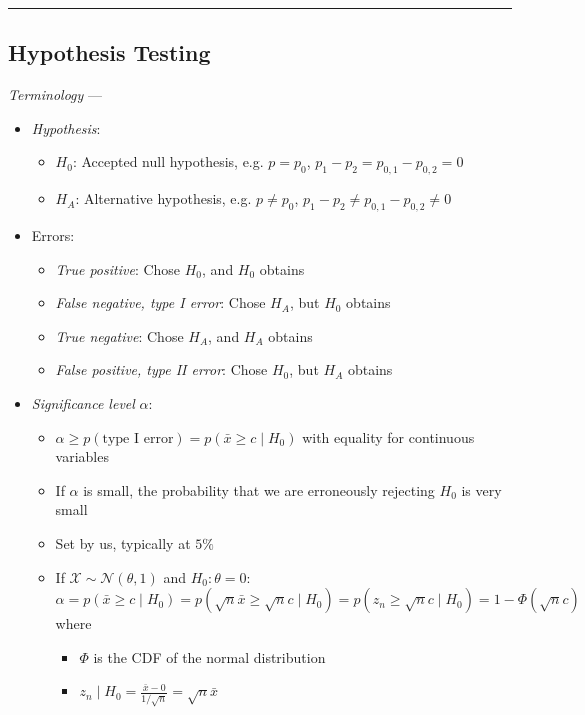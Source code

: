 {\color{black}\hrule height 0.001mm}

\subsection*{Hypothesis Testing}
\emph{Terminology} ---
\begin{itemize}
    \item \emph{Hypothesis}:
    \begin{itemize}
        \item $H_0$: Accepted null hypothesis, e.g. $p=p_0$, $p_1-p_2=p_{0,1}-p_{0,2}=0$
        \item $H_A$: Alternative hypothesis, e.g. $p \neq p_0$, $p_1-p_2 \neq p_{0,1}-p_{0,2} \neq 0$
    \end{itemize}
    \item Errors:
    \begin{itemize}
        \item \emph{True positive}: Chose $H_0$, and $H_0$ obtains
        \item \emph{False negative, type I error}: Chose $H_A$, but $H_0$ obtains
        \item \emph{True negative}: Chose $H_A$, and $H_A$ obtains
        \item \emph{False positive, type II error}: Chose $H_0$, but $H_A$ obtains
    \end{itemize}
    \item \emph{Significance level} $\alpha$: 
    \begin{itemize}
        \item $\alpha \geq p(\textrm{type I error}) = p(\bar{x} \geq c \mid H_0)$ with equality for continuous variables 
        \item If $\alpha$ is small, the probability that we are erroneously rejecting $H_0$ is very small
        \item Set by us, typically at $5\%$
        \item If $\mathcal{X} \sim \mathcal{N}(\theta,1)$ and $H_0: \theta = 0$:
        $\alpha = p(\bar{x} \geq c \mid H_0) = p(\sqrt{n}\bar{x} \geq \sqrt{n}c \mid H_0) = p(z_n \geq \sqrt{n}c \mid H_0) = 1-\Phi(\sqrt{n}c)$ 
        where 
        \begin{itemize}
            \item $\Phi$ is the CDF of the normal distribution 
            \item $z_n \mid H_0 = \frac{\bar{x}-0}{1/\sqrt{n}} = \sqrt{n}\bar{x}$
        \end{itemize}

\end{itemize}
\end{itemize}

